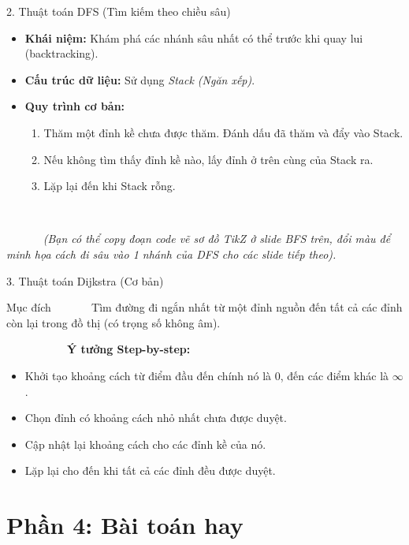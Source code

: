 \documentclass[11pt]{beamer}
\begin{document}
\begin{frame}{2. Thuật toán DFS (Tìm kiếm theo chiều sâu)}
    \begin{itemize}
        \item \textbf{Khái niệm:} Khám phá các nhánh sâu nhất có thể trước khi quay lui (backtracking). \pause
        \item \textbf{Cấu trúc dữ liệu:} Sử dụng \textit{Stack (Ngăn xếp)}. \pause
        \item \textbf{Quy trình cơ bản:}
        \begin{enumerate}
        \item Thăm một đỉnh kề chưa được thăm. Đánh dấu đã thăm và đẩy vào Stack. \pause
        \item Nếu không tìm thấy đỉnh kề nào, lấy đỉnh ở trên cùng của Stack ra. \pause
        \item Lặp lại đến khi Stack rỗng.
        \end{enumerate}
    \end{itemize}
    \vspace{0.5cm}
    \textit{(Bạn có thể copy đoạn code vẽ sơ đồ TikZ ở slide BFS trên, đổi màu để minh họa cách đi sâu vào 1 nhánh của DFS cho các slide tiếp theo).}
\end{frame}

\begin{frame}{3. Thuật toán Dijkstra (Cơ bản)}
    \begin{block}{Mục đích}
        Tìm đường đi ngắn nhất từ một đỉnh nguồn đến tất cả các đỉnh còn lại trong đồ thị (có trọng số không âm).
    \end{block}
    \pause
    
    \textbf{Ý tưởng Step-by-step:}
    \begin{itemize}
        \item<2-> Khởi tạo khoảng cách từ điểm đầu đến chính nó là $0$, đến các điểm khác là $\infty$.
        \item<3-> Chọn đỉnh có khoảng cách nhỏ nhất chưa được duyệt.
        \item<4-> Cập nhật lại khoảng cách cho các đỉnh kề của nó.
        \item<5-> Lặp lại cho đến khi tất cả các đỉnh đều được duyệt.
    \end{itemize}
\end{frame}


\section{Phần 4: Bài toán hay}
\end{document}
